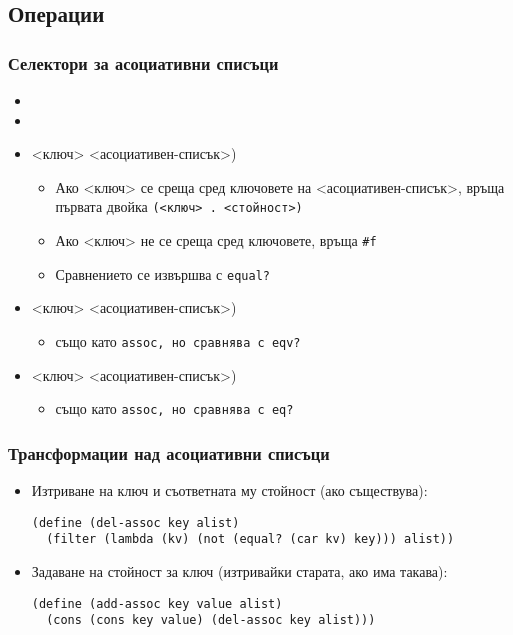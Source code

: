 \documentclass[alsotrans,beameroptions={aspectratio=169}]{beamerswitch}
\begin{document}
\subsection{Операции}

\begin{frame}[fragile]
  \frametitle{Селектори за асоциативни списъци}

  \begin{itemize}[<+->]
  \item {}
  \item {}
  \item {} <ключ> <асоциативен-списък>\tta)
    \begin{itemize}[<.->]
    \item Ако <ключ> се среща сред ключовете на <асоциативен-списък>,
      връща първата двойка \tt(<ключ> \tt. <стойност>\tt)
    \item Ако <ключ> не се среща сред ключовете, връща \tt{\#f}
    \item Сравнението се извършва с \tt{equal?}
    \end{itemize}
  \item {} <ключ> <асоциативен-списък>\tta)
    \begin{itemize}[<.->]
    \item също като \tt{assoc}, но сравнява с \tt{eqv?}
    \end{itemize}
  \item {} <ключ> <асоциативен-списък>\tta)
    \begin{itemize}[<.->]
    \item също като \tt{assoc}, но сравнява с \tt{eq?}
    \end{itemize}
  \end{itemize}
\end{frame}

\begin{frame}[fragile]
  \frametitle{Трансформации над асоциативни списъци}

  \begin{itemize}[<+->]
  \item Изтриване на ключ и съответната му стойност (ако съществува):\\
    \onslide<+->
\begin{lstlisting}
(define (del-assoc key alist)
  (filter (lambda (kv) (not (equal? (car kv) key))) alist))
\end{lstlisting}
  \item Задаване на стойност за ключ (изтривайки старата, ако има такава):\\
    \onslide<+->
\begin{lstlisting}
(define (add-assoc key value alist)
  (cons (cons key value) (del-assoc key alist)))
\end{lstlisting}
  \end{itemize}
\end{frame}
\end{document}
